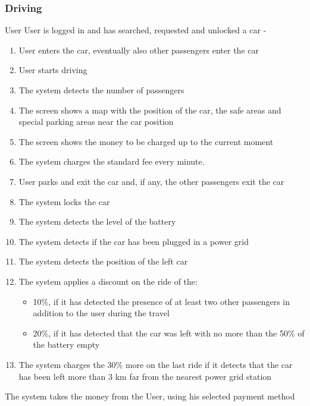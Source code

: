 \subsubsection{Driving}
{User}
{ \newline {} \newline {}}
{User is logged in and has searched, requested and unlocked a car}
{-}
{
\begin{enumerate}
\item User enters the car, eventually also other passengers enter the car
\item User starts driving
\item The system detects the number of passengers
\item The screen shows a map with the position of the car, the safe areas and special parking areas near the car position
\item The screen shows the money to be charged up to the current moment
\item The system charges the standard fee every minute.
\item User parks and exit the car and, if any, the other passengers exit the car
\item The system locks the car
\item The system detects the level of the battery
\item The system detects if the car has been plugged in a power grid
\item The system detects the position of the left car
\item The system applies a discount on the ride of the:
	\begin{itemize}
	\item 10\%, if it has detected the presence of at least two other passengers in addition to the user during the travel
	\item 20\%, if it has detected that the car was left with no more than the 50\% of the battery empty
	
	\end{itemize}
\item The system charges the 30\% more on the last ride if it detects that the car has been left more than 3 km far
	from the nearest power grid station
	\end{enumerate}
\item The system takes the money from the User, using his selected payment method
}
